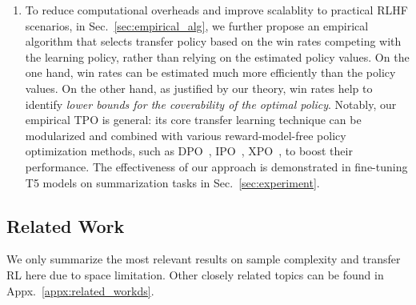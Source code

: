 \begin{enumerate}[leftmargin=0.2cm, itemsep=0.3pt]
\item[\textbullet] To reduce computational overheads and improve scalablity to practical RLHF scenarios, in Sec.~\ref{sec:empirical_alg}, we further propose an empirical algorithm that selects transfer policy based on the win rates competing with the learning policy, rather than relying on the estimated policy values.
On the one hand, win rates can be estimated much more efficiently than the policy values. On the other hand, as justified by our theory, win rates help to identify \emph{lower bounds for the coverability of the optimal policy}.
Notably, our empirical TPO is general: its core transfer learning technique can be modularized and combined with various reward-model-free policy optimization methods, such as DPO~\citep{rafailov2024direct}, IPO~\citep{azar2024general}, XPO~\citep{xie2024exploratory}, to boost their performance.
The effectiveness of our approach is demonstrated in fine-tuning T5 models on summarization tasks in Sec.~\ref{sec:experiment}.

%
%
%
%
%
%

\end{enumerate}

%
%
%
%
%
%
%
%


\subsection{Related Work}
%

We only summarize the most relevant results on sample complexity and transfer RL here due to space limitation. Other closely related topics can be found in Appx.~\ref{appx:related_workds}.

